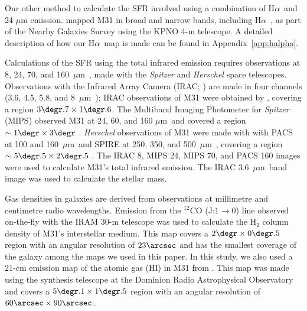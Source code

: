 \documentclass[useAMS,usenatbib]{mn2e}
\newcommand \halpha    {H$\alpha $\ }
\newcommand \um    {$\mu$m\ }
\newcommand \Spitzer {{\it Spitzer }}
\begin{document}
Our other method to calculate the SFR involved using a combination of \halpha and 24 $\mu$m emission. \citet{Massey06, Massey07} mapped M31 in broad and narrow bands, including \halpha, as part of the Nearby Galaxies Survey using the KPNO 4-m telescope. A detailed description of how our \halpha map is made can be found in Appendix~\ref{app:halpha}.

Calculations of the SFR using the total infrared emission requires observations at 8, 24, 70, and 160~\um, made
with the {\em Spitzer} \citep{Werner04} and {\em Herschel} \citep{Pilbratt10}  space telescopes. 
Observations with the Infrared Array Camera (IRAC; \citep{Fazio04}) are made in four channels (3.6, 4.5, 5.8, and 8~\um); IRAC observations of M31 were obtained by \cite{Barmby06}, covering a region $3\degr.7 \times 1\degr.6$. 
The Multiband Imaging Photometer for \Spitzer (MIPS) observed M31 at 24, 60, and 160 \um and covered a region $\sim 1\degr \times 3\degr$ \citep{Gordon06}. {\em Herschel} observations of M31 were made with with PACS \citep[Photodetector Array Camera and Spectrometer;][]{Poglitsch10}  at 100 and 160~\um and SPIRE  \citep[Spectral and Photometric Imaging Receiver;][]{Griffin10} 
at 250, 350, and 500~\um, covering a region  $\sim 5\degr.5 \times 2\degr.5$ \citep{Fritz12}.
The IRAC 8, MIPS 24, MIPS 70, and PACS 160 images were used to calculate M31's total infrared emission. 
The IRAC 3.6~\um band image was used to calculate the stellar mass. 

Gas densities in galaxies are derived from observations at millimetre and centimetre radio wavelengths.
Emission from the $^{12}$CO (J:$1\rightarrow0$) line observed on-the-fly with the IRAM 30-m telescope \citep{Nieten06} was used to calculate the H$_2$ column density of M31's interstellar medium. This map covers a $2\degr \times 0\degr.5$ region with an angular resolution of $23\arcsec$ and has the smallest coverage of the galaxy among the maps we used in this paper. In this study, we also used a 21-cm emission map of the atomic gas (HI) in M31 from \cite{Chemin09}. This map was made using the synthesis telescope at the Dominion Radio Astrophysical Observatory and covers a $5\degr.1 \times 1\degr.5$ region with an angular resolution of $60\arcsec \times 90\arcsec$.
\end{document}
